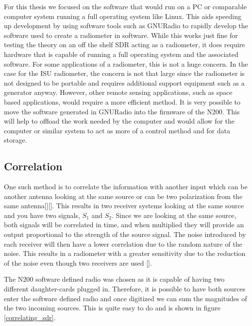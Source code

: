 For this thesis we focused on the software that would run on a PC or comparable computer system running a full operating system like Linux.  This aids speeding up development by using software tools such as GNURadio to rapidly develop the software used to create a radiometer in software.  While this works just fine for testing the theory on an off the shelf SDR acting as a radiometer, it does require hardware that is capable of running a full operating system and the associated software.  For some applications of a radiometer, this is not a huge concern.  In the case for the ISU radiometer, the concern is not that large since the radiometer is not designed to be portable and requires additional support equipment such as a generator anyway.  However, other remote sensing applications, such as space based applications, would require a more efficient method.  It is very possible to move the software generated in GNURadio into the firmware of the N200.  This will help to offload the work needed by the computer and would allow for the computer or similar system to act as more of a control method and for data storage.  

\subsection{Correlation}  
One such method is to correlate the information with another input which can be another antenna looking at the same source or can be two polarization from the same antenna[\cite{Clapp}][\cite{Aitken}].  This results in two receiver systems looking at the same source and you have two signals, $S_1$ and $S_2$.  Since we are looking at the same source, both signals will be correlated in time, and when multiplied they will provide an output proportional to the strength of the source signal.  The noise introduced by each receiver will then have a lower correlation due to the random nature of the noise.  This results in a radiometer with a greater sensitivity due to the reduction of the noise even though two receivers are used [\cite{Fujimoto}].

The N200 software defined radio was chosen as it is capable of having two different daughter-cards plugged in.  Therefore, it is possible to have both sources enter the software defined radio and once digitized we can sum the magnitudes of the two incoming sources.  This is quite easy to do and is shown in figure \ref{correlating_sdr}.

